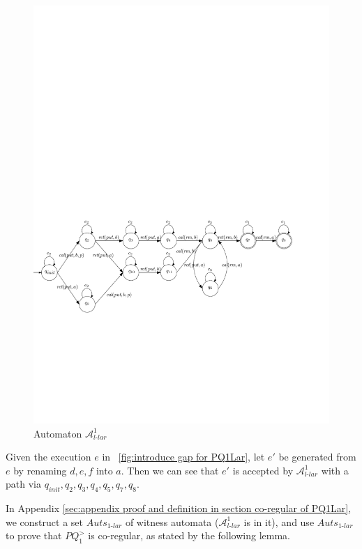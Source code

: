 \begin{figure}[htbp]
  \centering
  \includegraphics[width=1 \textwidth]{figures/PIC_AUTO_PQ1Lar-pprr.pdf}
  \caption{Automaton $\mathcal{A}_{\textit{l-lar}}^1$}
  \label{fig:automata APQ1Lar-1}
\end{figure}

Given the execution $e$ in \figurename~\ref{fig:introduce gap for PQ1Lar}, let $e'$ be generated from $e$ by renaming $d,e,f$ into $a$. Then we can see that $e'$ is accepted by $\mathcal{A}_{\textit{l-lar}}^1$ with a path via $q_{\textit{init}}, q_2, q_3, q_4,q_5,q_7,q_8$.

In Appendix \ref{sec:appendix proof and definition in section co-regular of PQ1Lar}, we construct a set $\textit{Auts}_{\textit{1-lar}}$ of witness automata ($\mathcal{A}_{\textit{l-lar}}^1$ is in it), and use $\textit{Auts}_{\textit{1-lar}}$ to prove that $\textit{PQ}_1^{>}$ is co-regular, as stated by the following lemma.

